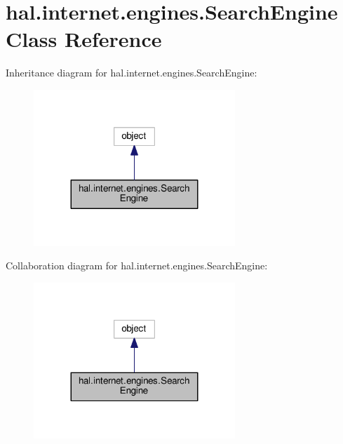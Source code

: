 \hypertarget{classhal_1_1internet_1_1engines_1_1_search_engine}{}\section{hal.\+internet.\+engines.\+Search\+Engine Class Reference}
\label{classhal_1_1internet_1_1engines_1_1_search_engine}


Inheritance diagram for hal.\+internet.\+engines.\+Search\+Engine\+:
\nopagebreak
\begin{figure}[H]
\begin{center}
\leavevmode
\includegraphics[width=215pt]{classhal_1_1internet_1_1engines_1_1_search_engine__inherit__graph}
\end{center}
\end{figure}


Collaboration diagram for hal.\+internet.\+engines.\+Search\+Engine\+:
\nopagebreak
\begin{figure}[H]
\begin{center}
\leavevmode
\includegraphics[width=215pt]{classhal_1_1internet_1_1engines_1_1_search_engine__coll__graph}
\end{center}
\end{figure}
